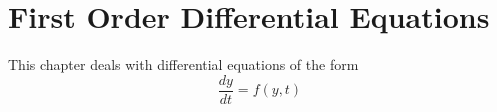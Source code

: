 \chapter{First Order Differential Equations}
    This chapter deals with differential equations of the form
    \begin{equation*}
        \frac{dy}{dt} = f(y, t)
    \end{equation*}
    
    
    